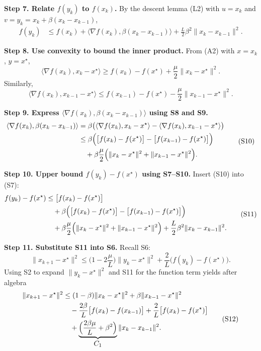 \documentclass{article}
\begin{document}
\noindent\textbf{Step 7.  Relate $f(y_{k})$ to $f(x_{k})$.}  
By the descent lemma (L2) with $u=x_{k}$ and $v=y_{k}=x_{k}+\beta(x_{k}-x_{k-1})$,
\[
\begin{aligned}
f(y_{k})
&\le f(x_{k})+\langle\nabla f(x_{k}),\beta(x_{k}-x_{k-1})\rangle
+\frac{L}{2}\beta^{2}\|x_{k}-x_{k-1}\|^{2}.
\end{aligned}
\tag{S7}
\]

\noindent\textbf{Step 8.  Use convexity to bound the inner product.}  
From (A2) with $x=x_{k}$, $y=x^{\star}$,
\[
\langle\nabla f(x_{k}),x_{k}-x^{\star}\rangle\ge
f(x_{k})-f(x^{\star})+\frac{\mu}{2}\|x_{k}-x^{\star}\|^{2}.
\tag{S8}
\]
Similarly,
\[
\langle\nabla f(x_{k}),x_{k-1}-x^{\star}\rangle\le
f(x_{k-1})-f(x^{\star})-\frac{\mu}{2}\|x_{k-1}-x^{\star}\|^{2}.
\tag{S9}
\]

\noindent\textbf{Step 9.  Express $\langle\nabla f(x_{k}),\beta(x_{k}-x_{k-1})\rangle$ using S8 and S9.}  
\[
\begin{aligned}
\langle\nabla f(x_{k}),\beta(x_{k}-x_{k-1})\rangle
&=\beta\bigl(\langle\nabla f(x_{k}),x_{k}-x^{\star}\rangle
-\langle\nabla f(x_{k}),x_{k-1}-x^{\star}\rangle\bigr)\\
&\le\beta\Bigl(\bigl[f(x_{k})-f(x^{\star})\bigr]-\bigl[f(x_{k-1})-f(x^{\star})\bigr]\Bigr)\\
&\quad+\beta\frac{\mu}{2}\Bigl(\|x_{k}-x^{\star}\|^{2}+\|x_{k-1}-x^{\star}\|^{2}\Bigr).
\end{aligned}
\tag{S10}
\]

\noindent\textbf{Step 10.  Upper bound $f(y_{k})-f(x^{\star})$ using S7–S10.}  
Insert (S10) into (S7):
\[
\begin{aligned}
f(y_{k})-f(x^{\star})
&\le \bigl[f(x_{k})-f(x^{\star})\bigr] \\
&\quad+\beta\Bigl(\bigl[f(x_{k})-f(x^{\star})\bigr]-\bigl[f(x_{k-1})-f(x^{\star})\bigr]\Bigr)\\
&\quad+\beta\frac{\mu}{2}\Bigl(\|x_{k}-x^{\star}\|^{2}+\|x_{k-1}-x^{\star}\|^{2}\Bigr)
+\frac{L}{2}\beta^{2}\|x_{k}-x_{k-1}\|^{2}.
\end{aligned}
\tag{S11}
\]

\noindent\textbf{Step 11.  Substitute S11 into S6.}  
Recall S6:
\[
\|x_{k+1}-x^{\star}\|^{2}
\le \bigl(1-2\frac{\mu}{L}\bigr)\|y_{k}-x^{\star}\|^{2}
+\frac{2}{L}\bigl(f(y_{k})-f(x^{\star})\bigr).
\]
Using S2 to expand $\|y_{k}-x^{\star}\|^{2}$ and S11 for the function term yields after algebra
\[
\begin{aligned}
\|x_{k+1}-x^{\star}\|^{2}
&\le (1-\beta) \|x_{k}-x^{\star}\|^{2}
+\beta\|x_{k-1}-x^{\star}\|^{2}\\
&\quad -\frac{2\beta}{L}\bigl[f(x_{k})-f(x_{k-1})\bigr]
+\frac{2}{L}\bigl[f(x_{k})-f(x^{\star})\bigr]\\
&\quad +\underbrace{\Bigl(\frac{2\beta\mu}{L}+\beta^{2}\Bigr)}_{\displaystyle C_{1}}\|x_{k}-x_{k-1}\|^{2}.
\end{aligned}
\tag{S12}
\]
\end{document}
